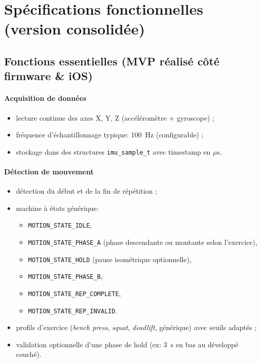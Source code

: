 \documentclass[a4paper,11pt]{article}
\begin{document}
\section{Spécifications fonctionnelles (version consolidée)}

\subsection{Fonctions essentielles (MVP réalisé côté firmware \& iOS)}

\paragraph{Acquisition de données}
\begin{itemize}
  \item lecture continue des axes X, Y, Z (accéléromètre + gyroscope) ;
  \item fréquence d'échantillonnage typique: 100~Hz (configurable) ;
  \item stockage dans des structures \texttt{imu\_sample\_t} avec timestamp en $\mu$s.
\end{itemize}

\paragraph{Détection de mouvement}
\begin{itemize}
  \item détection du début et de la fin de répétition ;
  \item machine à états générique:
  \begin{itemize}
    \item \texttt{MOTION\_STATE\_IDLE},
    \item \texttt{MOTION\_STATE\_PHASE\_A} (phase descendante ou montante selon l'exercice),
    \item \texttt{MOTION\_STATE\_HOLD} (pause isométrique optionnelle),
    \item \texttt{MOTION\_STATE\_PHASE\_B},
    \item \texttt{MOTION\_STATE\_REP\_COMPLETE},
    \item \texttt{MOTION\_STATE\_REP\_INVALID}.
  \end{itemize}
  \item profils d'exercice (\emph{bench press}, \emph{squat}, \emph{deadlift}, générique) avec seuils adaptés ;
  \item validation optionnelle d'une phase de hold (ex: 3~s en bas au développé couché).
\end{itemize}
\end{document}
